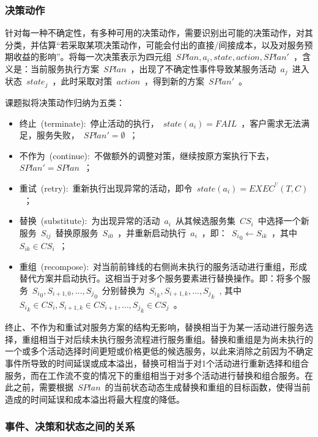 \subsubsection{决策动作}

针对每一种不确定性，有多种可用的决策动作，需要识别出可能的决策动作，对其分类，并估算“若采取某项决策动作，可能会付出的直接/间接成本，以及对服务预期收益的影响”。将每一次决策表示为四元组~$SPlan,{a_i},state,action,SPlan'$~，含义是：当前服务执行方案~$SPlan$~，出现了不确定性事件导致某服务活动~$a_j$~进入状态~$state_j$~，此时采取对策~$action$~，得到新的方案~$SPlan'$~。

课题拟将决策动作归纳为五类：
\begin{itemize}
    \item 终止~(terminate):~停止活动的执行，~$state(a_i)=FAIL$~，客户需求无法满足，服务失败，~$SPlan'=\emptyset $~；
    \item 不作为~(continue):~不做额外的调整对策，继续按原方案执行下去，~$SPlan'=SPlan$~；
    \item 重试~(retry):~重新执行出现异常的活动，即令~$state(a_i)=EXEC^{^U}(T, C)$~；
    \item 替换~(substitute):~为出现异常的活动~$a_i$~从其候选服务集~$CS_i$~中选择一个新服务~$S_{ij}$~替换原服务~$S_{i0}$~，并重新启动执行~$a_i$~，即：~${S_i}_0 \leftarrow {S_{ik}}$~，其中~${S_{ik}} \in C{S_i}$~；
    \item 重组~(recompose):~对当前前锋线的右侧尚未执行的服务活动进行重组，形成替代方案并启动执行。这相当于对多个服务要素进行替换操作。即：将多个服务~${S_i}_0,{S_{i + 1,0}}, \ldots ,{S_j}_0$~分别替换为~${S_i}_k,{S_{i + 1,k}}, \ldots ,{S_j}_k$~, 其中~${S_i}_k \in C{S_i},{S_{i + 1,k}} \in C{S_{i + 1}}, \ldots ,{S_j}_k \in C{S_j}$~。
\end{itemize}

终止、不作为和重试对服务方案的结构无影响，替换相当于为某一活动进行服务选择，重组相当于对后续未执行服务流程进行服务重组。替换和重组是为尚未执行的一个或多个活动选择时间更短或价格更低的候选服务，以此来消除之前因为不确定事件所导致的时间延误或成本溢出，替换可相当于对1个活动进行重新选择和组合服务，而在工作流不变的情况下的重组相当于对多个活动进行替换和组合服务。在此之前，需要根据~$SPlan$~的当前状态动态生成替换和重组的目标函数，使得当前造成的时间延误和成本溢出将最大程度的降低。

\subsubsection{事件、决策和状态之间的关系}

